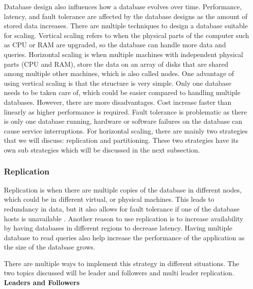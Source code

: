 Database design also influences how a database evolves over time. Performance, latency, and fault tolerance are affected by the database designs as the amount of stored data increases. 
There are multiple techniques to design a database suitable for scaling. 
Vertical scaling refers to when the physical parts of the computer such as CPU or RAM are upgraded, so the database can handle more data and queries. 
Horizontal scaling is when multiple machines with independent physical parts (CPU and RAM), store the data on an array of disks that are shared among multiple other machines,
which is also called nodes. 
One advantage of using vertical scaling is that the structure is very simple. Only one database needs to be taken care of, 
which could be easier compared to handling multiple databases. However, there are more disadvantages. 
Cost increase faster than linearly as higher performance is required. Fault tolerance is problematic as there is only one database running, 
hardware or software failures on the database can cause service interruptions.
For horizontal scaling, there are mainly two strategies that we will discuss: 
replication and partitioning. These two strategies have its own sub strategies which will be discussed in the next subsection. \\

\subsubsection[Replication]{Replication}

Replication is when there are multiple copies of the database in different nodes, which could be in different virtual, or physical machines.
This leads to redundancy in data, but it also allows for fault tolerance if one of the database hosts is unavailable \cite{Kleppmann_2017}.
Another reason to use replication is to increase availability by having databases in different regions to decrease latency.
Having multiple database to read queries also help increase the performance of the application as the size of the database grows.

There are multiple ways to implement this strategy in different situations. The two topics discussed will be leader and followers and multi leader replication. \\

\noindent \textbf{Leaders and Followers}


